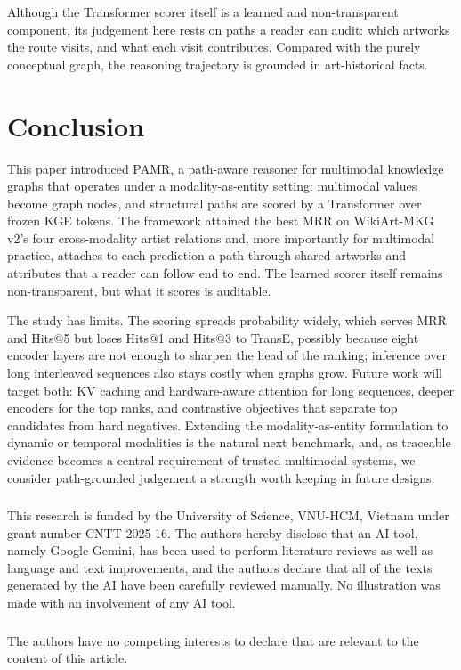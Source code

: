 \documentclass[runningheads]{llncs}
\begin{document}
Although the Transformer scorer itself is a learned and non-transparent component, its judgement here rests on paths a reader can audit: which artworks the route visits, and what each visit contributes. Compared with the purely conceptual graph, the reasoning trajectory is grounded in art-historical facts.

\section{Conclusion}
\label{sec:conclusion}

This paper introduced PAMR, a path-aware reasoner for multimodal knowledge graphs that operates under a modality-as-entity setting: multimodal values become graph nodes, and structural paths are scored by a Transformer over frozen KGE tokens. The framework attained the best MRR on WikiArt-MKG v2's four cross-modality artist relations and, more importantly for multimodal practice, attaches to each prediction a path through shared artworks and attributes that a reader can follow end to end. The learned scorer itself remains non-transparent, but what it scores is auditable.

The study has limits. The scoring spreads probability widely, which serves MRR and Hits@5 but loses Hits@1 and Hits@3 to TransE, possibly because eight encoder layers are not enough to sharpen the head of the ranking; inference over long interleaved sequences also stays costly when graphs grow. Future work will target both: KV caching and hardware-aware attention for long sequences, deeper encoders for the top ranks, and contrastive objectives that separate top candidates from hard negatives. Extending the modality-as-entity formulation to dynamic or temporal modalities is the natural next benchmark, and, as traceable evidence becomes a central requirement of trusted multimodal systems, we consider path-grounded judgement a strength worth keeping in future designs.

\begin{credits}
  \subsubsection{\ackname} This research is funded by the University of Science, VNU-HCM, Vietnam under grant number CNTT 2025-16. The authors hereby disclose that an AI tool, namely Google Gemini, has been used to perform literature reviews as well as language and text improvements, and the authors declare that all of the texts generated by the AI have been carefully reviewed manually. No illustration was made with an involvement of any AI tool.

  \subsubsection{\discintname}
  The authors have no competing interests to declare that are
  relevant to the content of this article.
\end{credits}



\end{document}
